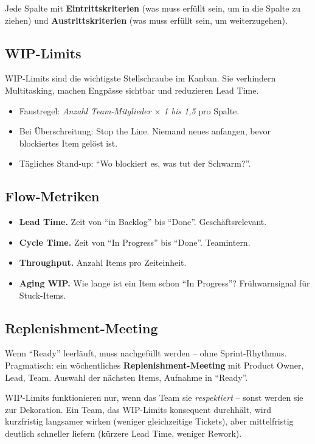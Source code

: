 \documentclass[11pt,a4paper,oneside]{article}
\newcommand{\fachbegriff}[1]{\textbf{#1}}
\begin{document}
Jede Spalte mit \fachbegriff{Eintrittskriterien} (was muss erfüllt sein, um in die Spalte zu ziehen) und \fachbegriff{Austrittskriterien} (was muss erfüllt sein, um weiterzugehen).

\subsection{WIP-Limits}

WIP-Limits sind die wichtigste Stellschraube im Kanban. Sie verhindern Multitasking, machen Engpässe sichtbar und reduzieren Lead Time.

\begin{itemize}
  \item Faustregel: \emph{Anzahl Team-Mitglieder $\times$ 1 bis 1,5} pro Spalte.
  \item Bei Überschreitung: Stop the Line. Niemand neues anfangen, bevor blockiertes Item gelöst ist.
  \item Tägliches Stand-up: ``Wo blockiert es, was tut der Schwarm?''.
\end{itemize}

\subsection{Flow-Metriken}

\begin{itemize}
  \item \fachbegriff{Lead Time.} Zeit von ``in Backlog'' bis ``Done''. Geschäftsrelevant.
  \item \fachbegriff{Cycle Time.} Zeit von ``In Progress'' bis ``Done''. Teamintern.
  \item \fachbegriff{Throughput.} Anzahl Items pro Zeiteinheit.
  \item \fachbegriff{Aging WIP.} Wie lange ist ein Item schon ``In Progress''? Frühwarnsignal für Stuck-Items.
\end{itemize}

\subsection{Replenishment-Meeting}

Wenn ``Ready'' leerläuft, muss nachgefüllt werden -- ohne Sprint-Rhythmus. Pragmatisch: ein wöchentliches \fachbegriff{Replenishment-Meeting} mit Product Owner, Lead, Team. Auswahl der nächsten Items, Aufnahme in ``Ready''.

\begin{merkbox}
WIP-Limits funktionieren nur, wenn das Team sie \emph{respektiert} -- sonst werden sie zur Dekoration. Ein Team, das WIP-Limits konsequent durchhält, wird kurzfristig langsamer wirken (weniger gleichzeitige Tickets), aber mittelfristig deutlich schneller liefern (kürzere Lead Time, weniger Rework).
\end{merkbox}
\end{document}

